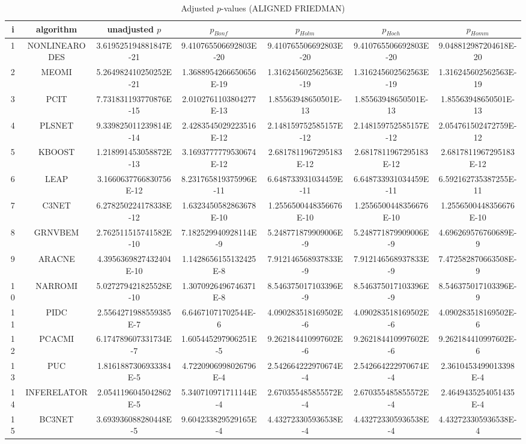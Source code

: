 \documentclass[a4paper,10pt]{article}
\begin{document}
\begin{landscape}
\begin{table}[!htp]
\centering\scriptsize
\caption{Adjusted $p$-values (ALIGNED FRIEDMAN)}
\begin{tabular}{ccccccc}
i&algorithm&unadjusted $p$&$p_{Bonf}$&$p_{Holm}$&$p_{Hoch}$&$p_{Homm}$\\
\hline
1&NONLINEARODES&3.619525194881847E-21&9.410765506692803E-20&9.410765506692803E-20&9.410765506692803E-20&9.048812987204618E-20\\
2&MEOMI&5.264982410250252E-21&1.3688954266650656E-19&1.316245602562563E-19&1.316245602562563E-19&1.316245602562563E-19\\
3&PCIT&7.731831193770876E-15&2.0102761103804277E-13&1.85563948650501E-13&1.85563948650501E-13&1.85563948650501E-13\\
4&PLSNET&9.339825011239814E-14&2.4283545029223516E-12&2.148159752585157E-12&2.148159752585157E-12&2.054761502472759E-12\\
5&KBOOST&1.218991453058872E-13&3.1693777779530674E-12&2.6817811967295183E-12&2.6817811967295183E-12&2.6817811967295183E-12\\
6&LEAP&3.1660637766830756E-12&8.231765819375996E-11&6.648733931034459E-11&6.648733931034459E-11&6.592162735387255E-11\\
7&C3NET&6.278250224178338E-12&1.6323450582863678E-10&1.2556500448356676E-10&1.2556500448356676E-10&1.2556500448356676E-10\\
8&GRNVBEM&2.762511515741582E-10&7.182529940928114E-9&5.248771879909006E-9&5.248771879909006E-9&4.696269576760689E-9\\
9&ARACNE&4.3956369827432404E-10&1.1428656155132425E-8&7.912146568937833E-9&7.912146568937833E-9&7.472582870663508E-9\\
10&NARROMI&5.027279421825528E-10&1.3070926496746371E-8&8.546375017103396E-9&8.546375017103396E-9&8.546375017103396E-9\\
11&PIDC&2.5564271988559385E-7&6.64671071702544E-6&4.090283518169502E-6&4.090283518169502E-6&4.090283518169502E-6\\
12&PCACMI&6.174789607331734E-7&1.605445297906251E-5&9.262184410997602E-6&9.262184410997602E-6&9.262184410997602E-6\\
13&PUC&1.8161887306933384E-5&4.7220906998026796E-4&2.542664222970674E-4&2.542664222970674E-4&2.3610453499013398E-4\\
14&INFERELATOR&2.0541196045042862E-5&5.340710971711144E-4&2.670355485855572E-4&2.670355485855572E-4&2.4649435254051435E-4\\
15&BC3NET&3.693936088280448E-5&9.604233829529165E-4&4.432723305936538E-4&4.432723305936538E-4&4.432723305936538E-4\\

\end{tabular}
\end{table}
\end{landscape}
\end{document}
